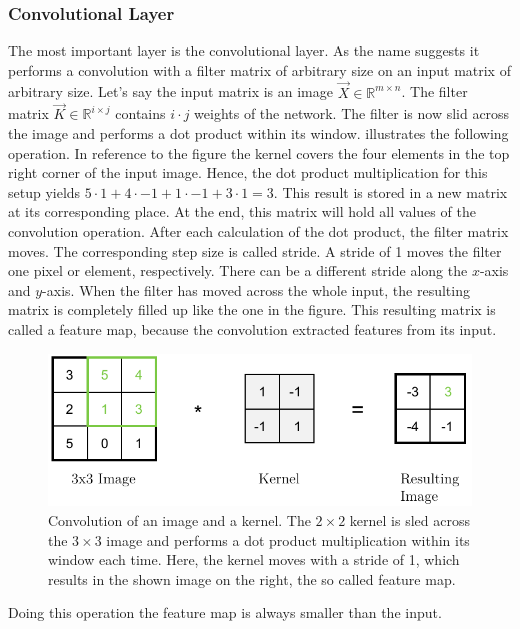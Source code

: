 \subsubsection{Convolutional Layer}
\label{sec:cnn-convolutional-layer}
The most important layer is the convolutional layer.
As the name suggests it performs a convolution with a filter matrix of arbitrary size on an input matrix of arbitrary size.
Let's say the input matrix is an image $\vec{X} \in \mathbb{R}^{m \times n}$.
The filter matrix $\vec{K} \in \mathbb{R}^{i \times j}$ contains $i \cdot j$ weights of the network.
The filter is now slid across the image and performs a dot product within its window.
 illustrates the following operation.
In reference to the figure the kernel covers the four elements in the top right corner of the input image.
Hence, the dot product multiplication for this setup yields $5 \cdot 1+4 \cdot -1+1 \cdot -1+3 \cdot 1=3$.
This result is stored in a new matrix at its corresponding place.
At the end, this matrix will hold all values of the convolution operation.
After each calculation of the dot product, the filter matrix moves.
The corresponding step size is called stride.
A stride of 1 moves the filter one pixel or element, respectively.
There can be a different stride along the $x$-axis and $y$-axis.
When the filter has moved across the whole input, the resulting matrix is completely filled up like the one in the figure.
This resulting matrix is called a feature map, because the convolution extracted features from its input.
\begin{figure}
	\centering
	\includegraphics{images/convolution.pdf}
	\caption[Convolution of an Image with a Kernel]{Convolution of an image and a kernel. The $2 \times 2$ kernel is sled across the $3 \times 3$ image and performs a dot product multiplication within its window each time. Here, the kernel moves with a stride of 1, which results in the shown image on the right, the so called feature map.}
	\label{fig:convolution}
\end{figure}
Doing this operation the feature map is always smaller than the input.

